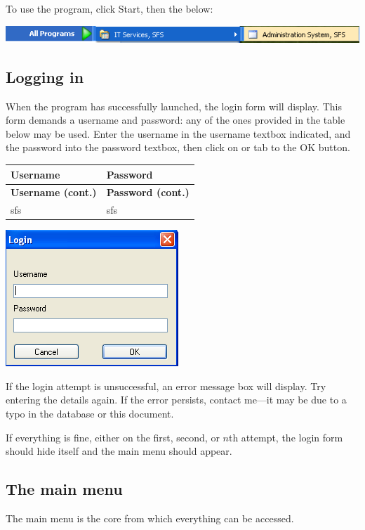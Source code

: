 To use the program, click Start, then the below:

\includegraphics[scale=0.5]{um_startmenu}

 	\subsection{Logging in}
	When the program has successfully launched, the login form will display.  This form demands a username and password: any of the ones provided in the table below may be used.  Enter the username in the username textbox indicated, and the password into the password textbox, then click on or tab to the OK button.

	\begin{longtable} { | p{2cm} | p{2cm} | }
		\hline
		\textbf{Username} & \textbf{Password}\\
		\endfirsthead		
		\hline
		\textbf{Username (cont.)} & \textbf{Password (cont.)}\\
		\endhead
		\hline
		sfs & sfs\\
		\hline
	\end{longtable}

\includegraphics[scale=0.5]{frmLoginForm_scrot}
	
	If the login attempt is unsuccessful, an error message box will display.  Try entering the details again.  If the error persists, contact me---it may be due to a typo in the database or this document.
	
	If everything is fine, either on the first, second, or $n$th attempt, the login form should hide itself and the main menu should appear.
	
	\subsection{The main menu}	
	The main menu is the core from which everything can be accessed.
	
